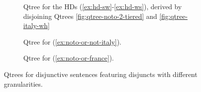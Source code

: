 	\begin{figure}[H]
\centering
\begin{subfigure}[b]{.3\linewidth}
	\centering
	\caption{Qtree for the HDs (\ref{ex:hd-sw}-\ref{ex:hd-ws}), derived by disjoining Qtrees \ref{fig:qtree-noto-2-tiered} and \ref{fig:qtree-italy-wh}}
	\label{fig:qtree-noto-or-italy}
\end{subfigure}\hfill
\begin{subfigure}[b]{.3\linewidth}
	\centering
	\caption{Qtree for (\ref{ex:noto-or-not-italy}).}
	\label{fig:qtree-noto-or-not-italy}
\end{subfigure}\hfill
\begin{subfigure}[b]{.3\linewidth}
	\centering
	\caption{Qtree for (\ref{ex:noto-or-france}).}
	\label{fig:qtree-noto-or-france}
\end{subfigure}
\caption{Qtrees for disjunctive sentences featuring disjuncts with different granularities.}
\end{figure}

